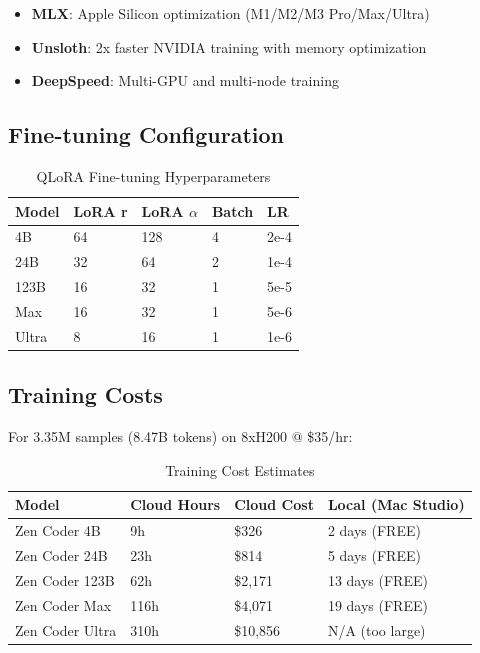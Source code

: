 \documentclass[11pt,a4paper]{article}
\begin{document}
\begin{itemize}
    \item \textbf{MLX}: Apple Silicon optimization (M1/M2/M3 Pro/Max/Ultra)
    \item \textbf{Unsloth}: 2x faster NVIDIA training with memory optimization
    \item \textbf{DeepSpeed}: Multi-GPU and multi-node training
\end{itemize}

\subsection{Fine-tuning Configuration}

\begin{table}[H]
\centering
\begin{tabular}{lllll}
\toprule
\textbf{Model} & \textbf{LoRA r} & \textbf{LoRA $\alpha$} & \textbf{Batch} & \textbf{LR} \\
\midrule
4B & 64 & 128 & 4 & 2e-4 \\
24B & 32 & 64 & 2 & 1e-4 \\
123B & 16 & 32 & 1 & 5e-5 \\
Max & 16 & 32 & 1 & 5e-6 \\
Ultra & 8 & 16 & 1 & 1e-6 \\
\bottomrule
\end{tabular}
\caption{QLoRA Fine-tuning Hyperparameters}
\end{table}

\subsection{Training Costs}

For 3.35M samples (8.47B tokens) on 8xH200 @ \$35/hr:

\begin{table}[H]
\centering
\begin{tabular}{llll}
\toprule
\textbf{Model} & \textbf{Cloud Hours} & \textbf{Cloud Cost} & \textbf{Local (Mac Studio)} \\
\midrule
Zen Coder 4B & 9h & \$326 & 2 days (FREE) \\
Zen Coder 24B & 23h & \$814 & 5 days (FREE) \\
Zen Coder 123B & 62h & \$2,171 & 13 days (FREE) \\
Zen Coder Max & 116h & \$4,071 & 19 days (FREE) \\
Zen Coder Ultra & 310h & \$10,856 & N/A (too large) \\
\bottomrule
\end{tabular}
\caption{Training Cost Estimates}
\end{table}
\end{document}

